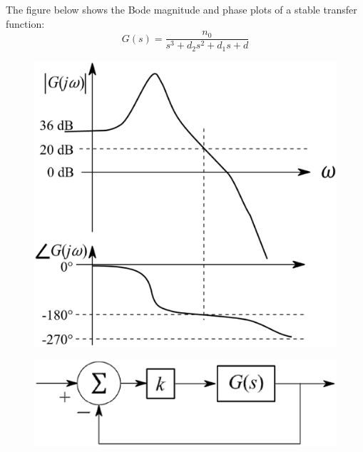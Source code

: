 \begin{enumerate}[label=\thesection.\arabic*.,ref=\thesection.\theenumi]


  The figure below shows the Bode magnitude and phase plots of a stable transfer function:
    \begin{equation}  
            G(s) = \frac{n_0}{s^3 + d_2 s^2 + d_1 s + d}
    \end{equation}
\begin{figure}[h]

        \includegraphics[width=\columnwidth]{./figs/ee18btech11025/q42_1.eps}
        \caption{}
        \label{fig:ee18btech11025}
  
\end{figure}
\begin{figure}[h]
    
    \includegraphics[width=\columnwidth]{./figs/ee18btech11025/q42.eps}
    \caption{}
    \label{}
  

\end{figure}
\end{enumerate}
